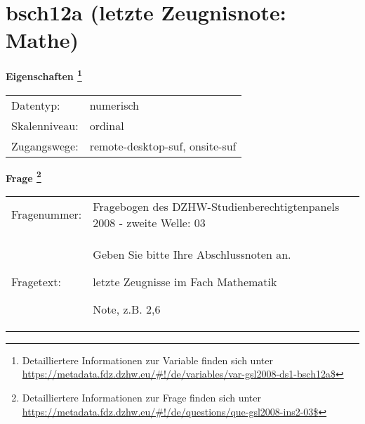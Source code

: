 
    \setcounter{footnote}{0}

    \vspace*{-1.8cm}
	\section{bsch12a (letzte Zeugnisnote: Mathe)}
	\label{section:bsch12a}



    \vspace*{0.5cm}
    \noindent\textbf{Eigenschaften
	\footnote{Detailliertere Informationen zur Variable finden sich unter
		\url{https://metadata.fdz.dzhw.eu/\#!/de/variables/var-gsl2008-ds1-bsch12a$}}}\\
	\begin{tabularx}{\hsize}{@{}lX}
	Datentyp: & numerisch \\
	Skalenniveau: & ordinal \\
	Zugangswege: &
	  remote-desktop-suf, 
	  onsite-suf
 \\
    \end{tabularx}



				\vspace*{0.5cm}
                \noindent\textbf{Frage
	                \footnote{Detailliertere Informationen zur Frage finden sich unter
		              \url{https://metadata.fdz.dzhw.eu/\#!/de/questions/que-gsl2008-ins2-03$}}}\\
				\begin{tabularx}{\hsize}{@{}lX}
					Fragenummer: &
					  Fragebogen des DZHW-Studienberechtigtenpanels 2008 - zweite Welle:
					  03
 \\
					Fragetext: & Geben Sie bitte Ihre Abschlussnoten an.\par  letzte Zeugnisse im Fach Mathematik\par  Note, z.B. 2,6 \\
				\end{tabularx}






